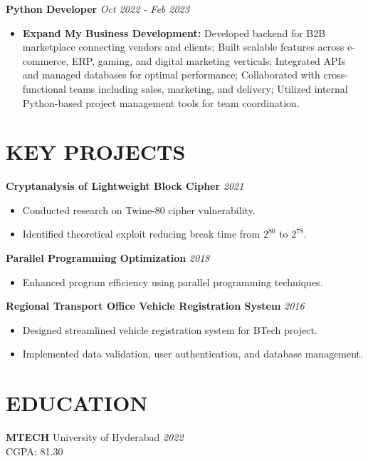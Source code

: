 \documentclass[10pt,a4paper]{article}
\begin{document}
\vspace{2mm}
\textbf{Python Developer} \hfill \textit{Oct 2022 - Feb 2023}
\begin{itemize}[leftmargin=*, itemsep=0pt, topsep=2pt, parsep=0pt]
    \item \textbf{Expand My Business Development:} Developed backend for B2B marketplace connecting vendors and clients; Built scalable features across e-commerce, ERP, gaming, and digital marketing verticals; Integrated APIs and managed databases for optimal performance; Collaborated with cross-functional teams including sales, marketing, and delivery; Utilized internal Python-based project management tools for team coordination.
\end{itemize}

\section*{KEY PROJECTS}

\textbf{Cryptanalysis of Lightweight Block Cipher} \hfill \textit{2021}
\begin{itemize}[leftmargin=*, itemsep=0pt, topsep=2pt, parsep=0pt]
    \item Conducted research on Twine-80 cipher vulnerability.
    \item Identified theoretical exploit reducing break time from $2^{80}$ to $2^{78}$.
\end{itemize}

\textbf{Parallel Programming Optimization} \hfill \textit{2018}
\begin{itemize}[leftmargin=*, itemsep=0pt, topsep=2pt, parsep=0pt]
    \item Enhanced program efficiency using parallel programming techniques.
\end{itemize}

\textbf{Regional Transport Office Vehicle Registration System} \hfill \textit{2016}
\begin{itemize}[leftmargin=*, itemsep=0pt, topsep=2pt, parsep=0pt]
    \item Designed streamlined vehicle registration system for BTech project.
    \item Implemented data validation, user authentication, and database management.
\end{itemize}

\section*{EDUCATION}
\textbf{MTECH} \hfill University of Hyderabad \hfill \textit{2022} \\
CGPA: 81.30
\vspace{2mm}
\end{document}

